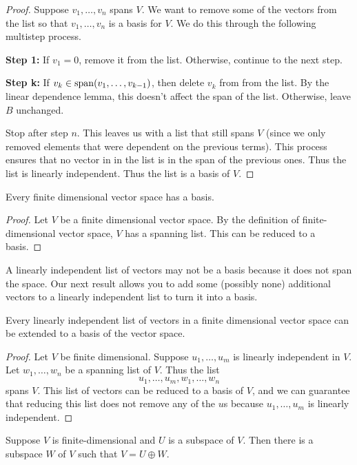 \begin{proof}
    Suppose $v_1, \dots, v_n$ spans $V$. We want to remove some of the vectors from the list so that $v_1, \dots, v_n$ is a basis for $V$. We do this through the following multistep process.

    \textbf{Step 1:} If $v_1 = 0$, remove it from the list. Otherwise, continue to the next step.

    \textbf{Step k:} If $v_k\in\operatorname{span}(v_1, \dots, v_{k-1})$, then delete $v_k$ from from the list. By the linear dependence lemma, this doesn't affect the span of the list. Otherwise, leave $B$ unchanged.

    Stop after step $n$. This leaves us with a list that still spans $V$ (since we only removed elements that were dependent on the previous terms). This process ensures that no vector in in the list is in the span of the previous ones. Thus the list is linearly independent. Thus the list is a basis of $V$.
\end{proof}
\begin{theorem}
    Every finite dimensional vector space has a basis.
\end{theorem}
\begin{proof}
    Let $V$ be a finite dimensional vector space. By the definition of finite-dimensional vector space, $V$ has a spanning list. This can be reduced to a basis. 
\end{proof}
A linearly independent list of vectors may not be a basis because it does not span the space. Our next result allows you to add some (possibly none) additional vectors to a linearly independent list to turn it into a basis.
\begin{theorem}
    Every linearly independent list of vectors in a finite dimensional vector space can be extended to a basis of the vector space.
\end{theorem}
\begin{proof}
    Let $V$ be finite dimensional. Suppose $u_1, \dots, u_m$ is linearly independent in $V$. Let $w_1, \dots, w_n$ be a spanning list of $V$. Thus the list
    \[ u_1, \dots, u_m, w_1, \dots, w_n\]
    spans $V$. This list of vectors can be reduced to a basis of $V$, and we can guarantee that reducing this list does not remove any of the $u$s because $u_1, \dots, u_m$ is linearly independent.
\end{proof}
\begin{theorem}
    Suppose $V$ is finite-dimensional and $U$ is a subspace of $V$. Then there is a subspace $W$ of $V$ such that $V = U\oplus W$.
\end{theorem}
